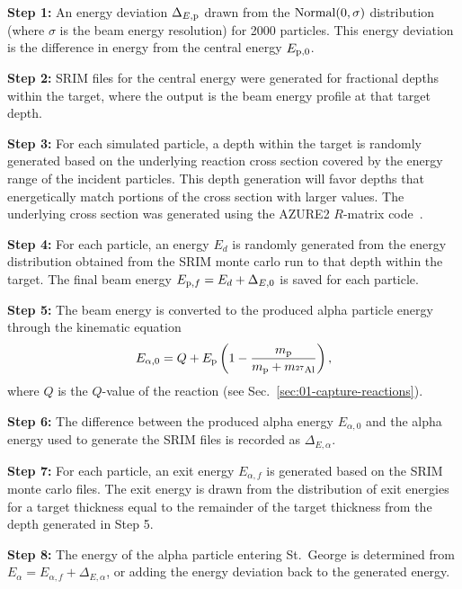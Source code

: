 \textbf{Step 1:}
  An energy deviation $\Delta_{E,{\rm p}}$ drawn from the ${\rm Normal}(0,\sigma)$
  distribution (where $\sigma$ is the beam energy resolution) for 2000
  particles. This energy deviation is the difference in energy from the central
  energy $E_{{\rm p},0}$.

\textbf{Step 2:}
  SRIM files for the central energy were generated for fractional depths
  within the target, where the output is the beam energy profile at that
  target depth.

\textbf{Step 3:}
  For each simulated particle, a depth within the target is randomly generated
  based on the underlying reaction cross section covered by the energy range of
  the incident particles. This depth generation will favor depths that
  energetically match portions of the cross section with larger values. The
  underlying cross section was generated using the AZURE2 $R$-matrix
  code~\cite{AZURE2, deBoer2017}.

\textbf{Step 4:}
  For each particle, an energy $E_d$ is randomly generated from the energy
  distribution obtained from the SRIM monte carlo run to that depth within the
  target. The final beam energy $E_{{\rm p},f} = E_d + \Delta_{E,0}$ is saved
  for each particle.

\textbf{Step 5:}
  The beam energy is converted to the produced alpha particle energy
  through the kinematic equation
  \[
      E_{\alpha,0} = Q + E_{\rm p}\left(
          1 - \frac{m_{\rm p}}{m_{\rm p} + m_{\mnuc{27}{Al}}} %
      \right),
  \]
  where $Q$ is the $Q$-value of the reaction (see
  Sec.~\ref{sec:01-capture-reactions}).

\textbf{Step 6:}
  The difference between the produced alpha energy $E_{\alpha,0}$ and the alpha
  energy used to generate the SRIM files is recorded as $\Delta_{E,\alpha}$.

\textbf{Step 7:}
  For each particle, an exit energy $E_{\alpha,f}$ is generated based on the
  SRIM monte carlo files. The exit energy is drawn from the distribution of
  exit energies for a target thickness equal to the remainder of the target
  thickness from the depth generated in Step 5.

\textbf{Step 8:}
  The energy of the alpha particle entering St.\ George is determined from
  $E_{\alpha} = E_{\alpha,f} + \Delta_{E,\alpha}$, or adding the energy
  deviation back to the generated energy.

